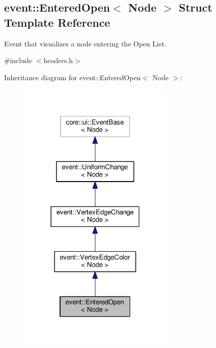 \hypertarget{structevent_1_1EnteredOpen}{}\subsection{event\+:\+:Entered\+Open$<$ Node $>$ Struct Template Reference}
\label{structevent_1_1EnteredOpen}


Event that visualizes a node entering the Open List.  




{\ttfamily \#include $<$headers.\+h$>$}



Inheritance diagram for event\+:\+:Entered\+Open$<$ Node $>$\+:\nopagebreak
\begin{figure}[H]
\begin{center}
\leavevmode
\includegraphics[width=211pt]{structevent_1_1EnteredOpen__inherit__graph}
\end{center}
\end{figure}


